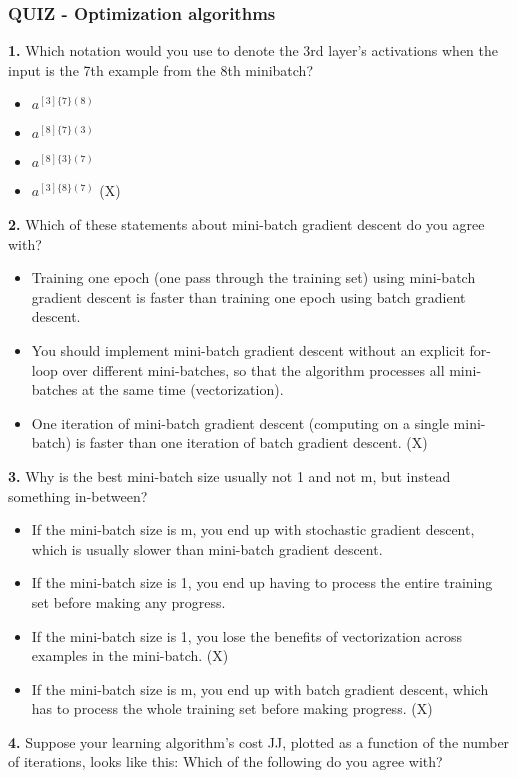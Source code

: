 \subsubsection*{QUIZ - Optimization algorithms}
\textbf{1.} Which notation would you use to denote the 3rd layer’s activations when the input is the 7th example from the 8th minibatch?
\begin{itemize}
    \item $a^{[3]\{7\}(8)}$
    \item $a^{[8]\{7\}(3)}$
    \item $a^{[8]\{3\}(7)}$
    \item $a^{[3]\{8\}(7)}$ (X)
\end{itemize}
\textbf{2.} Which of these statements about mini-batch gradient descent do you agree with?
\begin{itemize}
    \item Training one epoch (one pass through the training set) using mini-batch gradient descent is faster than training one epoch using batch gradient descent.
    \item You should implement mini-batch gradient descent without an explicit for-loop over different mini-batches, so that the algorithm processes all mini-batches at the same time (vectorization).
    \item One iteration of mini-batch gradient descent (computing on a single mini-batch) is faster than one iteration of batch gradient descent. (X)
\end{itemize}
\textbf{3.} Why is the best mini-batch size usually not 1 and not m, but instead something in-between?
\begin{itemize}
    \item If the mini-batch size is m, you end up with stochastic gradient descent, which is usually slower than mini-batch gradient descent.
    \item If the mini-batch size is 1, you end up having to process the entire training set before making any progress.
    \item If the mini-batch size is 1, you lose the benefits of vectorization across examples in the mini-batch. (X)
    \item If the mini-batch size is m, you end up with batch gradient descent, which has to process the whole training set before making progress. (X)
\end{itemize}
\textbf{4.} Suppose your learning algorithm’s cost JJ, plotted as a function of the number of iterations, looks like this:
Which of the following do you agree with?

